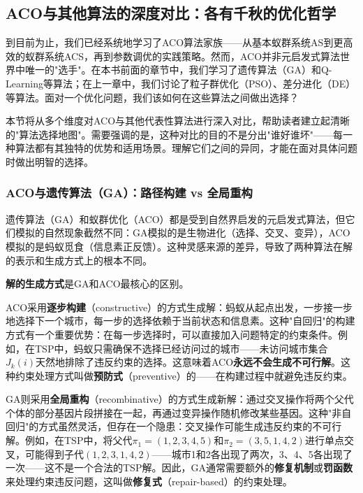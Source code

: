 \documentclass[lang=cn,zihao=-4,a4paper,fontset=windows]{beautybook}
\begin{document}
\subsection{ACO与其他算法的深度对比：各有千秋的优化哲学}

到目前为止，我们已经系统地学习了ACO算法家族——从基本蚁群系统AS到更高效的蚁群系统ACS，再到参数调优的实践策略。然而，ACO并非元启发式算法世界中唯一的"选手"。在本书前面的章节中，我们学习了遗传算法（GA）和Q-Learning等算法；在上一章中，我们讨论了粒子群优化（PSO）、差分进化（DE）等算法。面对一个优化问题，我们该如何在这些算法之间做出选择？





本节将从多个维度对ACO与其他代表性算法进行深入对比，帮助读者建立起清晰的"算法选择地图"。需要强调的是，这种对比的目的不是分出"谁好谁坏"——每一种算法都有其独特的优势和适用场景。理解它们之间的异同，才能在面对具体问题时做出明智的选择。

\subsubsection{ACO与遗传算法（GA）：路径构建 vs 全局重构}

遗传算法（GA）和蚁群优化（ACO）都是受到自然界启发的元启发式算法，但它们模拟的自然现象截然不同：GA模拟的是生物进化（选择、交叉、变异），ACO模拟的是蚂蚁觅食（信息素正反馈）。这种灵感来源的差异，导致了两种算法在解的表示和生成方式上的根本不同。

\textbf{解的生成方式}是GA和ACO最核心的区别。

ACO采用\textbf{逐步构建}（constructive）的方式生成解：蚂蚁从起点出发，一步接一步地选择下一个城市，每一步的选择依赖于当前状态和信息素。这种"自回归"的构建方式有一个重要优势：在每一步选择时，可以直接加入问题特定的约束条件。例如，在TSP中，蚂蚁只需确保不选择已经访问过的城市——未访问城市集合$J_k(i)$天然地排除了违反约束的选择。这意味着ACO\textbf{永远不会生成不可行解}。这种约束处理方式叫做\textbf{预防式}（preventive）的——在构建过程中就避免违反约束。

GA则采用\textbf{全局重构}（recombinative）的方式生成新解：通过交叉操作将两个父代个体的部分基因片段拼接在一起，再通过变异操作随机修改某些基因。这种"非自回归"的方式虽然灵活，但存在一个隐患：交叉操作可能生成违反约束的不可行解。例如，在TSP中，将父代$\pi_1 = (1,2,3,4,5)$和$\pi_2 = (3,5,1,4,2)$进行单点交叉，可能得到子代$(1,2,3,1,4,2)$——城市1和2各出现了两次，3、4、5各出现了一次——这不是一个合法的TSP解。因此，GA通常需要额外的\textbf{修复机制}或\textbf{罚函数}来处理约束违反问题，这叫做\textbf{修复式}（repair-based）的约束处理。
\end{document}

